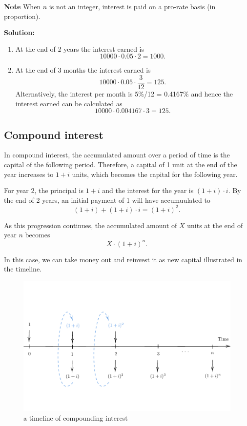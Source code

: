 \documentclass[landscape, 20pt]{extreport}
\theoremstyle{definition}
\theoremstyle{definition}
\theoremstyle{definition}
\theoremstyle{definition}
\theoremstyle{remark}
\begin{document}
\textbf{Note} When \(n\) is not an integer, interest is paid on a pro-rate
basis (in proportion).

\textbf{Solution:}

\begin{enumerate}
\def\labelenumi{\arabic{enumi}.}
\item
  At the end of 2 years the interest earned is
  \[10000 \cdot 0.05 \cdot 2 = 1000.\]
\item
  At the end of 3 months the interest earned is
  \[10000 \cdot 0.05 \cdot \frac{3}{12} = 125.\] Alternatively, the
  interest per month is 5\%/12 = 0.4167\% and hence the interest earned
  can be calculated as \[10000 \cdot 0.004167 \cdot 3 = 125.\]
\end{enumerate}

\hypertarget{compound-interest}{%
\newpage \subsection{Compound interest}\label{compound-interest}}

In compound interest, the accumulated amount over a period of time is the capital of the following period. Therefore, a capital of 1 unit at the end of the year increases to \(1 + i\) units, which becomes the capital for the following year.

For year 2, the principal is \(1 + i\) and the interest for the year is
\(( 1 + i ) \cdot i\). By the end of 2 years, an initial payment of 1 will have accumuulated to
\[ (1+i) + ( 1 + i ) \cdot i = (1+i)^2.\]

As this progression continues, the accumulated amount of \(X\) units at the end of year \(n\) becomes
\[ X\cdot(1 + i)^n. \]

\theNote In this case, we can take money out and reinvest it as new capital illustrated in the timeline.

\begin{figure}

{\centering \includegraphics{tikz-ex2-1} 

}

\caption{a timeline of compounding interest}\label{fig:tikz-ex2}
\end{figure}
\end{document}
